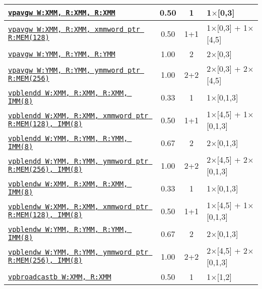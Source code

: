 \documentclass[a4paper,english,fontsize=9]{scrartcl}
\begin{document}
\begin{longtable}{p{}ccL{.25\textwidth}}
  \midrule
  \texttt{\href{https://felixcloutier.com/x86/PAVGB:PAVGW.html}{vpavgw W:XMM, R:XMM, R:XMM}} & 0.50 & 1 & 1\(\times\)[0,3] \\
  \midrule
  \texttt{\href{https://felixcloutier.com/x86/PAVGB:PAVGW.html}{vpavgw W:XMM, R:XMM, xmmword ptr R:MEM(128)}} & 0.50 & 1+1 & 1\(\times\)[0,3] + 1\(\times\)[4,5] \\
  \midrule
  \texttt{\href{https://felixcloutier.com/x86/PAVGB:PAVGW.html}{vpavgw W:YMM, R:YMM, R:YMM}} & 1.00 & 2 & 2\(\times\)[0,3] \\
  \midrule
  \texttt{\href{https://felixcloutier.com/x86/PAVGB:PAVGW.html}{vpavgw W:YMM, R:YMM, ymmword ptr R:MEM(256)}} & 1.00 & 2+2 & 2\(\times\)[0,3] + 2\(\times\)[4,5] \\
  \midrule
  \texttt{\href{https://felixcloutier.com/x86/VPBLENDD.html}{vpblendd W:XMM, R:XMM, R:XMM, IMM(8)}} & 0.33 & 1 & 1\(\times\)[0,1,3] \\
  \midrule
  \texttt{\href{https://felixcloutier.com/x86/VPBLENDD.html}{vpblendd W:XMM, R:XMM, xmmword ptr R:MEM(128), IMM(8)}} & 0.50 & 1+1 & 1\(\times\)[4,5] + 1\(\times\)[0,1,3] \\
  \midrule
  \texttt{\href{https://felixcloutier.com/x86/VPBLENDD.html}{vpblendd W:YMM, R:YMM, R:YMM, IMM(8)}} & 0.67 & 2 & 2\(\times\)[0,1,3] \\
  \midrule
  \texttt{\href{https://felixcloutier.com/x86/VPBLENDD.html}{vpblendd W:YMM, R:YMM, ymmword ptr R:MEM(256), IMM(8)}} & 1.00 & 2+2 & 2\(\times\)[4,5] + 2\(\times\)[0,1,3] \\
  \midrule
  \texttt{\href{https://felixcloutier.com/x86/PBLENDW.html}{vpblendw W:XMM, R:XMM, R:XMM, IMM(8)}} & 0.33 & 1 & 1\(\times\)[0,1,3] \\
  \midrule
  \texttt{\href{https://felixcloutier.com/x86/PBLENDW.html}{vpblendw W:XMM, R:XMM, xmmword ptr R:MEM(128), IMM(8)}} & 0.50 & 1+1 & 1\(\times\)[4,5] + 1\(\times\)[0,1,3] \\
  \midrule
  \texttt{\href{https://felixcloutier.com/x86/PBLENDW.html}{vpblendw W:YMM, R:YMM, R:YMM, IMM(8)}} & 0.67 & 2 & 2\(\times\)[0,1,3] \\
  \midrule
  \texttt{\href{https://felixcloutier.com/x86/PBLENDW.html}{vpblendw W:YMM, R:YMM, ymmword ptr R:MEM(256), IMM(8)}} & 1.00 & 2+2 & 2\(\times\)[4,5] + 2\(\times\)[0,1,3] \\
  \midrule
  \texttt{\href{https://felixcloutier.com/x86/VPBROADCASTB:VPBROADCASTW:VPBROADCASTD:VPBROADCASTQ.html}{vpbroadcastb W:XMM, R:XMM}} & 0.50 & 1 & 1\(\times\)[1,2] \\

\end{longtable}
\end{document}

